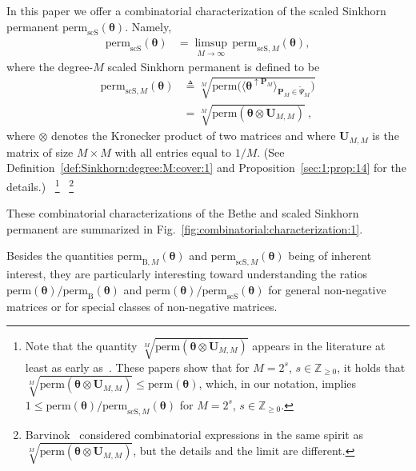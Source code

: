 \documentclass[journal,lettersize,twocolumn]{IEEEtran} %
\newcommand{\sZ}{\mathbb{Z}}
\newcommand{\matr}[1]{ \bm{#1} }
\newcommand{\defeq}{ \triangleq }
\newcommand{\perm}{ \mathrm{perm} }
\newcommand{\permb}{ \mathrm{perm}_{\mathrm{B}} }
\newcommand{\permbM}[1]{\perm_{ \mathrm{B}, #1 }}
\newcommand{\permscs}{ \mathrm{perm}_{\mathrm{scS}} }
\newcommand{\permscsM}[1]{ \mathrm{perm}_{\mathrm{scS},#1} }
\newcommand{\mtheta}{\matr{\theta}}
\newcommand{\sZp}{\sZ_{\geq 0}}
\newcommand{\mP}{\matr{P}}
\newcommand{\mU}{\matr{U}}
\newcommand{\tPsi}{\tilde{\Psi}}
\begin{document}
%

In this paper we offer a combinatorial characterization of the scaled Sinkhorn
permanent $\permscs(\mtheta)$. Namely,
\begin{align}
  \permscs(\mtheta)
    &= \limsup_{M \to \infty} \, 
         \permscsM{M}(\mtheta), 
           \label{eq:scaled:Sinkhorn:permanent:as:limit:1}
\end{align}
where the degree-$M$ scaled Sinkhorn permanent is defined to be \\[-0.35cm]
\begin{align}
  \permscsM{M}(\mtheta)
    &\defeq 
       \sqrt[M]{
         \perm
           \bigl(
             \langle
               \mtheta^{\uparrow \mP_{M}}
             \rangle_{\mP_{M} \in \tPsi_{M} }
           \bigr)
       } \\
    &= \sqrt[M]{
         \perm( \mtheta \otimes \mU_{M,M})
       } \ , \label{eq:def:degree:M:scaled:Sinkhorn:permanent:1}
\end{align}
where $\otimes$ denotes the Kronecker product of two matrices and where
$ \mU_{M,M} $ is the matrix of size $M \times M$ with all entries equal to
$1/M$.  (See Definition~\ref{def:Sinkhorn:degree:M:cover:1} and
Proposition~\ref{sec:1:prop:14} for the details.)%
~\footnote{Note that the quantity
  $\sqrt[M]{ \perm( \mtheta \otimes \mU_{M,M}) }$ appears in the literature at
  least as early as~\cite{Bang1976,Friedland1979}. These papers show that for
  $M = 2^s$, $s \in \sZp$, it holds that
  $\sqrt[M]{ \perm( \mtheta \otimes \mU_{M,M}) } \leq \perm(\mtheta)$, which,
  in our notation, implies $1 \leq \perm(\mtheta) / \permscsM{M}(\mtheta)$ for
  $M = 2^s$, $s \in \sZp$.}%
~\footnote{Barvinok~\cite{Barvinok2010} considered combinatorial expressions
  in the same spirit as $\sqrt[M]{ \perm( \mtheta \otimes \mU_{M,M}) }$, but
  the details and the limit are different.}

%

These combinatorial characterizations of the Bethe and scaled Sinkhorn
permanent are summarized in Fig.~\ref{fig:combinatorial:characterization:1}.

%

Besides the quantities $\permbM{M}(\mtheta)$ and $\permscsM{M}(\mtheta)$ being
of inherent interest, they are particularly interesting toward understanding
the ratios $\perm(\mtheta) / \permb(\mtheta)$ and
$\perm(\mtheta) / \permscs(\mtheta)$ for general non-negative matrices or for
special classes of non-negative matrices.

%
\end{document}

